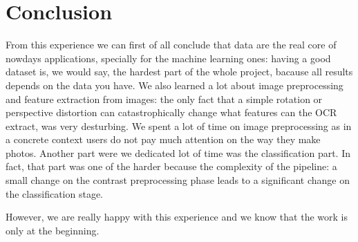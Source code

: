 \documentclass[10pt,twocolumn,letterpaper]{article}
\begin{document}
\section{Conclusion}
\label{sec:conclusion}

From this experience we can first of all conclude that data are the
real core of nowdays applications, specially for the machine learning
ones: having a good dataset is, we would say, the hardest part of the
whole project, bacause all results depends on the data you have. We
also learned a lot about image preprocessing and feature extraction
from images: the only fact that a simple rotation or perspective
distortion can catastrophically change what features can the OCR
extract, was very desturbing. We spent a lot of time on image
preprocessing as in a concrete context users do not pay much attention
on the way they make photos. Another part were we dedicated lot of
time was the classification part. In fact, that part was one of the
harder because the complexity of the pipeline: a small change on the
contrast preprocessing phase leads to a significant change on the
classification stage.

However, we are really happy with this experience and we know that the
work is only at the beginning.

{\small


}
\end{document}
